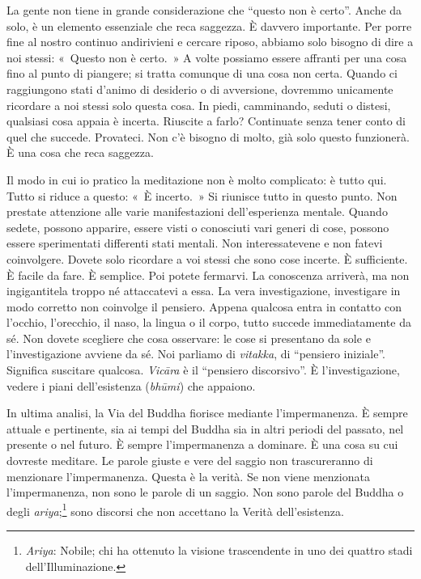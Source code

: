 La gente non tiene in grande considerazione che ``questo non è certo''.
Anche da solo, è un elemento essenziale che reca saggezza. È davvero
importante. Per porre fine al nostro continuo andirivieni e cercare
riposo, abbiamo solo bisogno di dire a noi stessi: «~Questo non è
certo.~» A volte possiamo essere affranti per una cosa fino al punto di
piangere; si tratta comunque di una cosa non certa. Quando ci
raggiungono stati d'animo di desiderio o di avversione, dovremmo
unicamente ricordare a noi stessi solo questa cosa. In piedi,
camminando, seduti o distesi, qualsiasi cosa appaia è incerta. Riuscite
a farlo? Continuate senza tener conto di quel che succede. Provateci.
Non c'è bisogno di molto, già solo questo funzionerà. È una cosa che
reca saggezza.

Il modo in cui io pratico la meditazione non è molto complicato: è tutto
qui. Tutto si riduce a questo: «~È incerto.~» Si riunisce tutto in
questo punto. Non prestate attenzione alle varie manifestazioni
dell'esperienza mentale. Quando sedete, possono apparire, essere visti o
conosciuti vari generi di cose, possono essere sperimentati differenti
stati mentali. Non interessatevene e non fatevi coinvolgere. Dovete solo
ricordare a voi stessi che sono cose incerte. È sufficiente. È facile da
fare. È semplice. Poi potete fermarvi. La conoscenza arriverà, ma non
ingigantitela troppo né attaccatevi a essa. La vera investigazione,
investigare in modo corretto non coinvolge il pensiero. Appena qualcosa
entra in contatto con l'occhio, l'orecchio, il naso, la lingua o il
corpo, tutto succede immediatamente da sé. Non dovete scegliere che cosa
osservare: le cose si presentano da sole e l'investigazione avviene da
sé. Noi parliamo di \emph{vitakka}, di ``pensiero iniziale''. Significa
suscitare qualcosa. \emph{Vicāra} è il ``pensiero discorsivo''. È
l'investigazione, vedere i piani dell'esistenza (\emph{bhūmi}) che
appaiono.

In ultima analisi, la Via del Buddha fiorisce mediante l'impermanenza.
È sempre attuale e pertinente, sia ai tempi del Buddha sia in altri
periodi del passato, nel presente o nel futuro. È sempre l'impermanenza
a dominare. È una cosa su cui dovreste meditare. Le parole giuste e vere
del saggio non trascureranno di menzionare l'impermanenza. Questa è la
verità. Se non viene menzionata l'impermanenza, non sono le parole di
un saggio. Non sono parole del Buddha o degli \emph{ariya};\footnote{\emph{Ariya}:
  Nobile; chi ha ottenuto la visione trascendente in uno dei quattro
  stadi dell'Illuminazione.} sono discorsi che non accettano la Verità
dell'esistenza.

